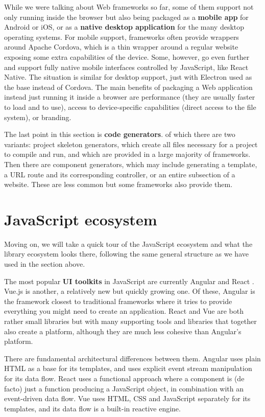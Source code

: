\documentclass[english,odsaz]{fitthesis}
\begin{document}
While we were talking about Web frameworks so far, some of them support not only
running inside the browser but also being packaged as a \textbf{mobile app} for Android
or iOS, or as a \textbf{native desktop application} for the many desktop operating
systems. For mobile support, frameworks often provide wrappers around Apache
Cordova, which is a thin wrapper around a regular website exposing some extra
capabilities of the device. Some, however, go even further and support fully
native mobile interfaces controlled by JavaScript, like React Native. The
situation is similar for desktop support, just with Electron used as the base
instead of Cordova. The main benefits of packaging a Web application instead
just running it inside a browser are performance (they are usually faster to
load and to use), access to device-specific capabilities (direct access to the
file system), or branding.

The last point in this section is \textbf{code generators}. of which there are two
variants: project skeleton generators, which create all files necessary for a
project to compile and run, and which are provided in a large majority of
frameworks. Then there are component generators, which may include generating a
template, a URL route and its corresponding controller, or an entire subsection
of a website. These are less common but some frameworks also provide them.

\section{JavaScript ecosystem}
\label{sec:org6d33cfc}
Moving on, we will take a quick tour of the JavaScript ecosystem and what the
library ecosystem looks there, following the same general structure as we have
used in the section above.

The most popular \textbf{UI toolkits} in JavaScript are currently Angular \cite{angular}
and React \cite{react}. Vue.js \cite{vuejs} is another, a relatively new but quickly
growing one. Of these, Angular is the framework closest to traditional
frameworks where it tries to provide everything you might need to create an
application. React and Vue are both rather small libraries but with many
supporting tools and libraries that together also create a platform, although
they are much less cohesive than Angular's platform.

There are fundamental architectural differences between them. Angular uses plain
HTML as a base for its templates, and uses explicit event stream manipulation
for its data flow. React uses a functional approach where a component is (de
facto) just a function producing a JavaScript object, in combination with an
event-driven data flow. Vue uses HTML, CSS and JavaScript separately for its
templates, and its data flow is a built-in reactive engine.
\end{document}
